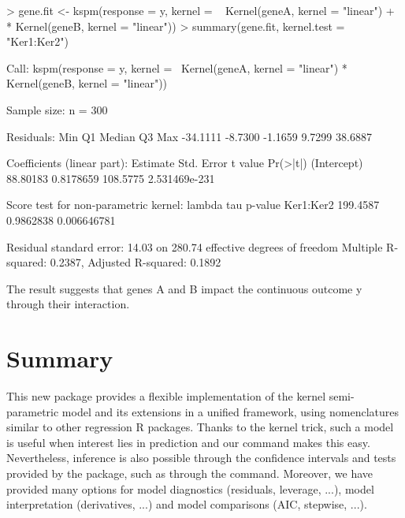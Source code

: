 \begin{example}
> gene.fit <- kspm(response = y, kernel = ~ Kernel(geneA, kernel = "linear") 
+    * Kernel(geneB, kernel = "linear"))
> summary(gene.fit, kernel.test = "Ker1:Ker2")
\end{example}
\begin{example}
Call:
kspm(response = y, kernel = ~Kernel(geneA, kernel = "linear") * 
    Kernel(geneB, kernel = "linear"))

Sample size:
n = 300

Residuals: 
     Min       Q1   Median       Q3      Max 
-34.1111  -8.7300  -1.1659   9.7299  38.6887 

Coefficients (linear part): 
            Estimate Std. Error  t value      Pr(>|t|)
(Intercept) 88.80183  0.8178659 108.5775 2.531469e-231

Score test for non-parametric kernel: 
            lambda       tau     p-value
Ker1:Ker2 199.4587 0.9862838 0.006646781

Residual standard error: 14.03 on 280.74 effective degrees of freedom
Multiple R-squared: 0.2387, Adjusted R-squared: 0.1892
\end{example}


The result suggests that genes A and B impact the continuous outcome y through their interaction.




\section{Summary}


This new  package provides a flexible implementation of the kernel semi-parametric model and its extensions in a unified framework, using nomenclatures similar to other regression R packages. Thanks to the kernel trick, such a model is useful when interest lies in prediction and our  command makes this easy. Nevertheless, inference is also possible through the confidence intervals and tests provided by the package, such as through the  command. Moreover, we have provided many options for model diagnostics (residuals,  leverage, ...), model interpretation (derivatives, ...) and model comparisons (AIC, stepwise, ...).\\

